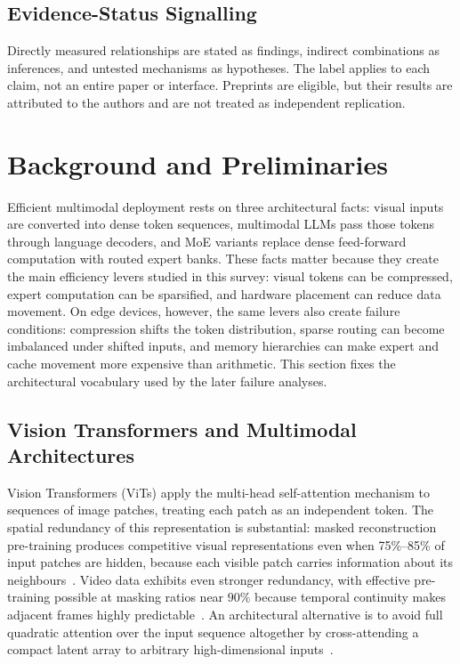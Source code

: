 \documentclass[10pt]{article}
\newenvironment{reviewchange}{\begingroup\color{red}}{\endgroup}
\begin{document}
\begin{reviewchange}
\subsection{Evidence-Status Signalling}
\label{sec:evidence-classification}

Directly measured relationships are stated as findings, indirect combinations as
inferences, and untested mechanisms as hypotheses.  The label applies to each claim,
not an entire paper or interface.  Preprints are eligible, but their results are
attributed to the authors and are not treated as independent replication.
\end{reviewchange}

\section{Background and Preliminaries}
\label{sec:background}

Efficient multimodal deployment rests on three architectural facts: visual inputs are
converted into dense token sequences, multimodal LLMs pass those tokens through language
decoders, and MoE variants replace dense feed-forward computation with routed expert
banks.  These facts matter because they create the main efficiency levers studied in
this survey: visual tokens can be compressed, expert computation can be sparsified, and
hardware placement can reduce data movement.  On edge devices, however, the same levers
also create failure conditions: compression shifts the token distribution, sparse
routing can become imbalanced under shifted inputs, and memory hierarchies can make
expert and cache movement more expensive than arithmetic.  This section fixes the
architectural vocabulary used by the later failure analyses.

\subsection{Vision Transformers and Multimodal Architectures}

Vision Transformers (ViTs) apply the multi-head self-attention mechanism to sequences
of image patches, treating each patch as an independent token. The spatial redundancy of this representation is substantial: masked reconstruction pre-training produces competitive visual representations even when 75\%--85\% of input patches are hidden, because each visible patch carries information about its neighbours~\citep{he2021maskedautoencodersscalablevision}.
Video data exhibits even stronger redundancy, with effective pre-training possible at
masking ratios near $90\%$ because temporal continuity makes adjacent frames highly
predictable~\citep{tong2022videomaemaskedautoencodersdataefficient}.  An architectural alternative is to avoid full
quadratic attention over the input sequence altogether by cross-attending a compact
latent array to arbitrary high-dimensional inputs~\citep{jaegle2021perceivergeneralperceptioniterative}.
\end{document}
